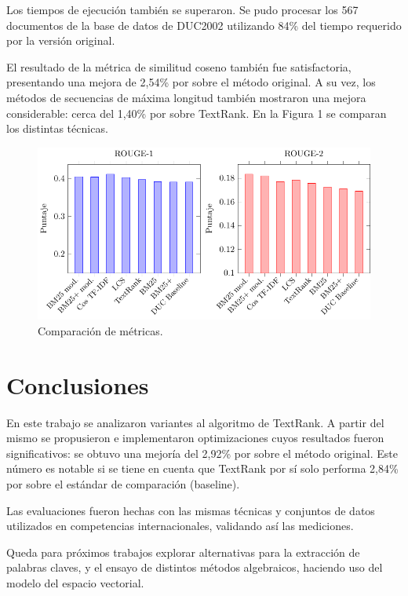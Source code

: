 \documentclass{llncs}
\begin{document}
Los tiempos de ejecución también se superaron. Se pudo procesar los 567 documentos de la base de datos de DUC2002 utilizando 84\% del tiempo requerido por la versión original.

El resultado de la métrica de similitud coseno también fue satisfactoria, presentando una mejora de 2,54\% por sobre el método original. A su vez, los métodos de secuencias de máxima longitud también mostraron una mejora considerable: cerca del 1,40\% por sobre TextRank. En la Figura 1 se comparan los distintas técnicas.

\begin{figure}[h!]
    \centering
    \includegraphics[width=1\textwidth]{rouge-scores.pdf}
    \caption{Comparación de métricas.}
\end{figure}

\section{Conclusiones}
En este trabajo se analizaron variantes al algoritmo de TextRank. A partir del mismo se propusieron e implementaron optimizaciones cuyos resultados fueron significativos: se obtuvo una mejoría del 2,92\% por sobre el método original. Este número es notable si se tiene en cuenta que TextRank por sí solo performa 2,84\% por sobre el estándar de comparación (baseline).

Las evaluaciones fueron hechas con las mismas técnicas y conjuntos de datos utilizados en competencias internacionales, validando así las mediciones.

Queda para próximos trabajos explorar alternativas para la extracción de palabras claves, y el ensayo de distintos métodos algebraicos, haciendo uso del modelo del espacio vectorial.


{}

\end{document}
